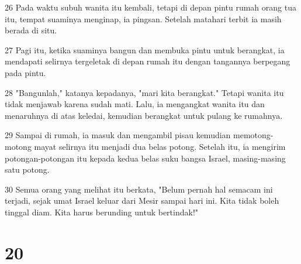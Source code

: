 \par 26 Pada waktu subuh wanita itu kembali, tetapi di depan pintu rumah orang tua itu, tempat suaminya menginap, ia pingsan. Setelah matahari terbit ia masih berada di situ.
\par 27 Pagi itu, ketika suaminya bangun dan membuka pintu untuk berangkat, ia mendapati selirnya tergeletak di depan rumah itu dengan tangannya berpegang pada pintu.
\par 28 "Bangunlah," katanya kepadanya, "mari kita berangkat." Tetapi wanita itu tidak menjawab karena sudah mati. Lalu, ia mengangkat wanita itu dan menaruhnya di atas keledai, kemudian berangkat untuk pulang ke rumahnya.
\par 29 Sampai di rumah, ia masuk dan mengambil pisau kemudian memotong-motong mayat selirnya itu menjadi dua belas potong. Setelah itu, ia mengirim potongan-potongan itu kepada kedua belas suku bangsa Israel, masing-masing satu potong.
\par 30 Semua orang yang melihat itu berkata, "Belum pernah hal semacam ini terjadi, sejak umat Israel keluar dari Mesir sampai hari ini. Kita tidak boleh tinggal diam. Kita harus berunding untuk bertindak!"

\chapter{20}

